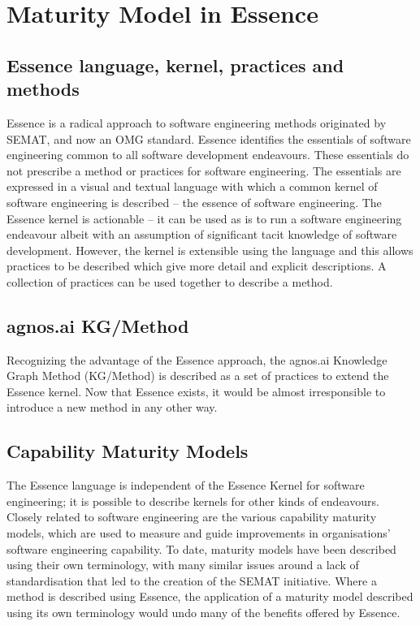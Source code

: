 \pagebreak
\section{Maturity Model in Essence}

\subsection{Essence language, kernel, practices and methods}\label{subsec:Essence-language-kernel-practices-and-methods}

Essence is a radical approach to software engineering methods originated by SEMAT, and now an OMG standard. Essence identifies the essentials
of software engineering common to all software development endeavours. These essentials do not prescribe a method or practices for software
engineering. The essentials are expressed in a visual and textual language with which a common kernel of software engineering is described –
the essence of software engineering. The Essence kernel is actionable – it can be used as is to run a software engineering endeavour albeit
with an assumption of significant tacit knowledge of software development. However, the kernel is extensible using the language and this allows
practices to be described which give more detail and explicit descriptions. A collection of practices can be used together to describe a method.

\subsection{agnos.ai KG/Method}\label{subsec:agnos-ai-KG-Method}
Recognizing the advantage of the Essence approach, the agnos.ai Knowledge Graph Method (KG/Method) is described as a set of practices to extend
the Essence kernel. Now that Essence exists, it would be almost irresponsible to introduce a new method in any other way.

\subsection{Capability Maturity Models}\label{subsec:Capability-Maturity-Models}
The Essence language is independent of the Essence Kernel for software engineering; it is possible to describe kernels for other kinds of endeavours.
Closely related to software engineering are the various capability maturity models, which are used to measure and guide improvements in organisations’
software engineering capability. To date, maturity models have been described using their own terminology, with many similar issues around a lack of
standardisation that led to the creation of the SEMAT initiative. Where a method is described using Essence, the application of a maturity model described
using its own terminology would undo many of the benefits offered by Essence.

